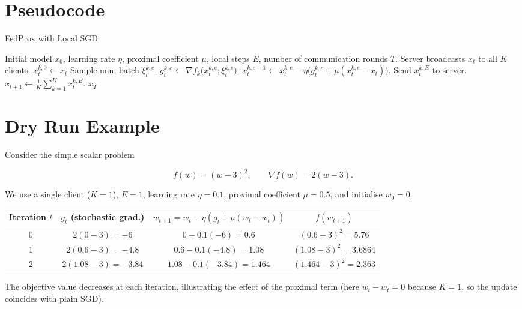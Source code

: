 \documentclass{article}
\begin{document}
\section*{Pseudocode}
\begin{algorithm}[H]
\caption{FedProx with Local SGD}
\begin{algorithmic}[1]
\REQUIRE Initial model $x_0$, learning rate $\eta$, proximal coefficient $\mu$, local steps $E$, number of communication rounds $T$.
    \STATE Server broadcasts $x_t$ to all $K$ clients.
        \STATE $x_{t}^{k,0}\leftarrow x_t$
            \STATE Sample mini‑batch $\xi_{t}^{k,e}$.
            \STATE $g_{t}^{k,e}\leftarrow \nabla f_k\bigl(x_{t}^{k,e};\xi_{t}^{k,e}\bigr)$.
            \STATE $x_{t}^{k,e+1}\leftarrow x_{t}^{k,e}
                    -\eta\bigl(g_{t}^{k,e}+ \mu (x_{t}^{k,e}-x_t)\bigr)$.
        \ENDFOR
        \STATE Send $x_{t}^{k,E}$ to server.
    \ENDFOR
    \STATE $x_{t+1}\leftarrow \frac1K\sum_{k=1}^K x_{t}^{k,E}$.
\ENDFOR
\RETURN $x_T$
\end{algorithmic}
\end{algorithm}

\section*{Dry Run Example}
Consider the simple scalar problem  

\[
f(w) = (w-3)^2, \qquad \nabla f(w)=2(w-3).
\]

We use a single client ($K=1$), $E=1$, learning rate $\eta=0.1$, proximal coefficient
$\mu=0.5$, and initialise $w_0=0$.

\begin{center}
\begin{tabular}{c|c|c|c}
Iteration $t$ & $g_t$ (stochastic grad.) & $w_{t+1}=w_t-\eta(g_t+\mu(w_t-w_t))$ & $f(w_{t+1})$\\ \hline
0 & $2(0-3)=-6$ & $0-0.1(-6)=0.6$ & $(0.6-3)^2=5.76$\\
1 & $2(0.6-3)=-4.8$ & $0.6-0.1(-4.8)=1.08$ & $(1.08-3)^2=3.6864$\\
2 & $2(1.08-3)=-3.84$ & $1.08-0.1(-3.84)=1.464$ & $(1.464-3)^2=2.363$\\
\end{tabular}
\end{center}

The objective value decreases at each iteration, illustrating the effect of the
proximal term (here $w_t-w_t=0$ because $K=1$, so the update coincides with plain SGD).
\end{document}
